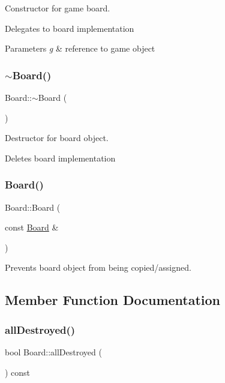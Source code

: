 Constructor for game board. 

Delegates to board implementation 
\begin{DoxyParams}{Parameters}
{\em g} & reference to game object \\
\hline
\end{DoxyParams}
\mbox{\label{class_board_af73f45730119a1fd8f6670f53f959e68}} 
\subsubsection{\texorpdfstring{$\sim$\+Board()}{~Board()}}
{\footnotesize\ttfamily Board\+::$\sim$\+Board (\begin{DoxyParamCaption}{ }\end{DoxyParamCaption})}



Destructor for board object. 

Deletes board implementation \mbox{\label{class_board_a1b25abe81ff08e6b574ecfc2dcaaa5be}} 
\subsubsection{\texorpdfstring{Board()}{Board()}\hspace{0.1cm}{\footnotesize\ttfamily [2/2]}}
{\footnotesize\ttfamily Board\+::\+Board (\begin{DoxyParamCaption}\item[{const \mbox{\hyperlink{class_board}{Board}} \&}]{ }\end{DoxyParamCaption})\hspace{0.3cm}{\ttfamily [delete]}}



Prevents board object from being copied/assigned. 



\subsection{Member Function Documentation}
\mbox{\label{class_board_a4653d3028e70fea9f56523173a2e0a13}} 
\subsubsection{\texorpdfstring{all\+Destroyed()}{allDestroyed()}}
{\footnotesize\ttfamily bool Board\+::all\+Destroyed (\begin{DoxyParamCaption}{ }\end{DoxyParamCaption}) const}

